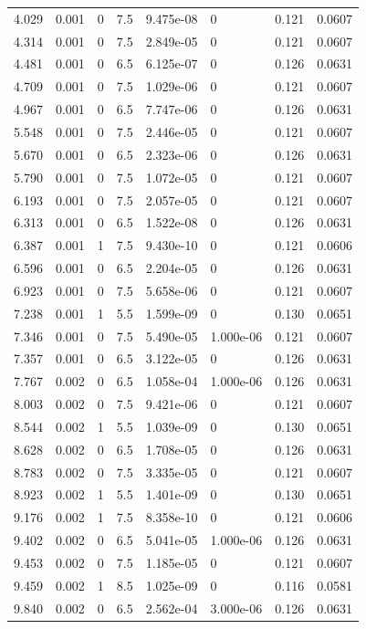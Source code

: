 \documentclass[preview]{standalone}
\begin{document}
{{\begin{tabular}{L{1.2cm}C{1.2cm} C{0.3cm}C{0.5cm} C{1.4cm}C{1.4cm} C{1.4cm}C{1.4cm}}
  4.029  &  0.001  & 0     & 7.5 &  9.475e-08  & 0  & 0.121 &  0.0607   \\ 
  4.314  &  0.001  & 0     & 7.5 &  2.849e-05  & 0  & 0.121 &  0.0607   \\ 
  4.481  &  0.001  & 0     & 6.5 &  6.125e-07  & 0  & 0.126 &  0.0631   \\ 
  4.709  &  0.001  & 0     & 7.5 &  1.029e-06  & 0  & 0.121 &  0.0607   \\ 
  4.967  &  0.001  & 0     & 6.5 &  7.747e-06  & 0  & 0.126 &  0.0631   \\ 
  5.548  &  0.001  & 0     & 7.5 &  2.446e-05  & 0  & 0.121 &  0.0607   \\ 
  5.670  &  0.001  & 0     & 6.5 &  2.323e-06  & 0  & 0.126 &  0.0631   \\ 
  5.790  &  0.001  & 0     & 7.5 &  1.072e-05  & 0  & 0.121 &  0.0607   \\ 
  6.193  &  0.001  & 0     & 7.5 &  2.057e-05  & 0  & 0.121 &  0.0607   \\ 
  6.313  &  0.001  & 0     & 6.5 &  1.522e-08  & 0  & 0.126 &  0.0631   \\ 
  6.387  &  0.001  & 1     & 7.5 &  9.430e-10  & 0  & 0.121 &  0.0606   \\ 
  6.596  &  0.001  & 0     & 6.5 &  2.204e-05  & 0  & 0.126 &  0.0631   \\ 
  6.923  &  0.001  & 0     & 7.5 &  5.658e-06  & 0  & 0.121 &  0.0607   \\ 
  7.238  &  0.001  & 1     & 5.5 &  1.599e-09  & 0  & 0.130 &  0.0651   \\ 
  7.346  &  0.001  & 0     & 7.5 &  5.490e-05  & 1.000e-06  & 0.121 &  0.0607   \\ 
  7.357  &  0.001  & 0     & 6.5 &  3.122e-05  & 0  & 0.126 &  0.0631   \\ 
  7.767  &  0.002  & 0     & 6.5 &  1.058e-04  & 1.000e-06  & 0.126 &  0.0631   \\ 
  8.003  &  0.002  & 0     & 7.5 &  9.421e-06  & 0  & 0.121 &  0.0607   \\ 
  8.544  &  0.002  & 1     & 5.5 &  1.039e-09  & 0  & 0.130 &  0.0651   \\ 
  8.628  &  0.002  & 0     & 6.5 &  1.708e-05  & 0  & 0.126 &  0.0631   \\ 
  8.783  &  0.002  & 0     & 7.5 &  3.335e-05  & 0  & 0.121 &  0.0607   \\ 
  8.923  &  0.002  & 1     & 5.5 &  1.401e-09  & 0  & 0.130 &  0.0651   \\ 
  9.176  &  0.002  & 1     & 7.5 &  8.358e-10  & 0  & 0.121 &  0.0606   \\ 
  9.402  &  0.002  & 0     & 6.5 &  5.041e-05  & 1.000e-06  & 0.126 &  0.0631   \\ 
  9.453  &  0.002  & 0     & 7.5 &  1.185e-05  & 0  & 0.121 &  0.0607   \\ 
  9.459  &  0.002  & 1     & 8.5 &  1.025e-09  & 0  & 0.116 &  0.0581   \\ 
  9.840  &  0.002  & 0     & 6.5 &  2.562e-04  & 3.000e-06  & 0.126 &  0.0631   \\ 
\hline 
\end{tabular} 

}}
\end{document}
